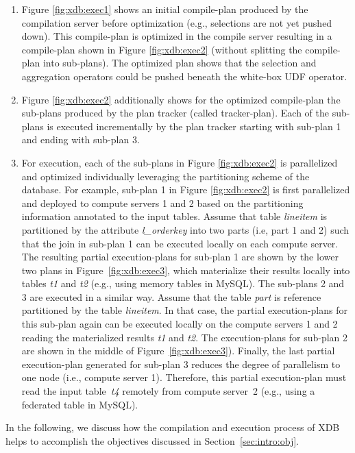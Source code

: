 \documentclass{sig-alternate}
\begin{document}
\begin{enumerate}
\item Figure \ref{fig:xdb:exec1} shows an initial compile-plan produced by the compilation server before optimization (e.g., selections are not yet pushed down). This compile-plan is optimized in the compile server resulting in a compile-plan shown in Figure \ref{fig:xdb:exec2} (without splitting the compile-plan into sub-plans). The optimized plan shows that the selection and aggregation operators could be pushed beneath the white-box UDF operator.
\item Figure \ref{fig:xdb:exec2} additionally shows for the optimized compile-plan the sub-plans produced by the plan tracker (called tracker-plan). Each of the sub-plans is executed incrementally by the plan tracker starting with sub-plan 1 and ending with sub-plan 3.
\item For execution, each of the sub-plans in Figure \ref{fig:xdb:exec2} is parallelized and optimized individually leveraging the partitioning scheme of the database. For example, sub-plan 1 in Figure \ref{fig:xdb:exec2} is first parallelized and deployed to compute servers 1 and 2 based on the partitioning information annotated to the input tables. Assume that table \emph{lineitem} is partitioned by the attribute \emph{l\_orderkey} into two parts (i.e, part 1 and 2) such that the join in sub-plan 1 can be executed locally on each compute server. The resulting partial execution-plans for sub-plan 1 are shown by the lower two plans in Figure~\ref{fig:xdb:exec3}, which materialize their results locally into tables \emph{t1} and \emph{t2} (e.g., using memory tables in MySQL). The sub-plans 2 and 3 are executed in a similar way. Assume that the table \emph{part} is reference partitioned by the table \emph{lineitem}. In that case, the partial execution-plans for this sub-plan again can be executed locally on the compute servers 1 and 2 reading the materialized results \emph{t1} and \emph{t2}. The execution-plans for sub-plan 2 are shown in the middle of Figure~\ref{fig:xdb:exec3}). Finally, the last partial execution-plan generated for sub-plan 3 reduces the degree of parallelism to one node (i.e., compute server 1). Therefore, this partial execution-plan must read the input table~\emph{t4} remotely from compute server~2 (e.g., using a federated table in MySQL). 
\end{enumerate}

In the following, we discuss how the compilation and execution process of XDB helps to accomplish the objectives discussed in Section~\ref{sec:intro:obj}.\\
\end{document}
